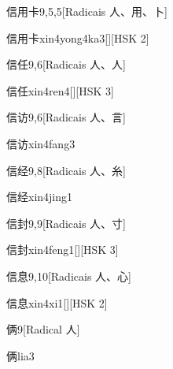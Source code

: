 \begin{entry}{信用卡}{9,5,5}[Radicais ⼈、⽤、⼘]
  \begin{phonetics}{信用卡}{xin4yong4ka3}[][HSK 2]
  \end{phonetics}
\end{entry}

\begin{entry}{信任}{9,6}[Radicais ⼈、⼈]
  \begin{phonetics}{信任}{xin4ren4}[][HSK 3]
  \end{phonetics}
\end{entry}

\begin{entry}{信访}{9,6}[Radicais ⼈、⾔]
  \begin{phonetics}{信访}{xin4fang3}
  \end{phonetics}
\end{entry}

\begin{entry}{信经}{9,8}[Radicais ⼈、⽷]
  \begin{phonetics}{信经}{xin4jing1}
  \end{phonetics}
\end{entry}

\begin{entry}{信封}{9,9}[Radicais ⼈、⼨]
  \begin{phonetics}{信封}{xin4feng1}[][HSK 3]
  \end{phonetics}
\end{entry}

\begin{entry}{信息}{9,10}[Radicais ⼈、⼼]
  \begin{phonetics}{信息}{xin4xi1}[][HSK 2]
  \end{phonetics}
\end{entry}

\begin{entry}{俩}{9}[Radical ⼈]
  \begin{phonetics}{俩}{lia3}
  \end{phonetics}
\end{entry}

